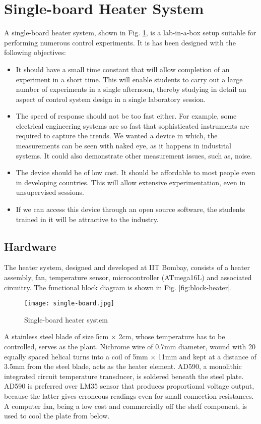 \section{Single-board Heater System}
\label{sec:sbhs}
A single-board heater system, shown in Fig. \ref{fig:single-board},
is a lab-in-a-box setup suitable for performing numerous control
experiments.  It is has been designed with the following objectives:  
\begin{itemize}
\item It should have a small time constant that will allow completion
  of an experiment in a short time.  This will enable students to
  carry out a large number of experiments in a single afternoon,
  thereby studying in detail an aspect of control system design in a
  single laboratory session.
\item The speed of response should not be too fast either.  For
  example, some electrical engineering systems are so fast that
  sophisticated instruments are required to capture the trends.  We
  wanted a device in which, the measurements can be seen with naked
  eye, as it happens in industrial systems.  It could also demonstrate
  other measurement issues, such as, noise.
\item The device should be of low cost.  It should be affordable to
  most people even in developing countries.  This will allow extensive
  experimentation, even in unsupervised sessions.
\item If we can access this device through an open source software,
  the students trained in it will be attractive to the industry.
\end{itemize}

\subsection{Hardware}
The heater system, designed and developed at IIT Bombay, consists of a
heater assembly, fan, temperature sensor, microcontroller (ATmega16L)
and associated circuitry.  The functional block
diagram is shown in Fig. \ref{fig:block-heater}.

\begin{figure}
\texttt{[image: single-board.jpg]}
\caption{Single-board heater system}
\label{fig:single-board}
\end{figure}

A stainless steel blade of size 5cm $\times$ 2cm, whose temperature
has to be controlled, serves as the plant.  Nichrome wire of 0.7mm
diameter, wound with 20 equally spaced helical turns into a coil of
5mm $\times$ 11mm and kept at a distance of 3.5mm from the steel
blade, acts as the heater element.  AD590, a monolithic integrated
circuit temperature transducer, is soldered beneath the steel plate.
AD590 is preferred over LM35 sensor that produces proportional voltage
output, because the latter gives erroneous readings even for small
connection resistances.  A computer fan, being a low cost and
commercially off the shelf component, is used to cool the plate from
below.

